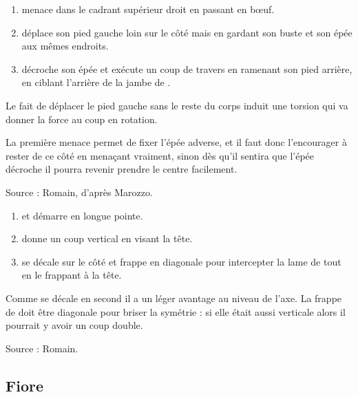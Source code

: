 \begin{technique}

\begin{enumerate}
	\item \A menace \D dans le cadrant supérieur droit en passant en bœuf.
	
	\item \A déplace son pied gauche loin sur le côté mais en gardant son buste et son épée aux mêmes endroits.
	
	\item \A décroche son épée et exécute un coup de travers en ramenant son pied arrière, en ciblant l'arrière de la jambe de \D.
\end{enumerate}

Le fait de déplacer le pied gauche sans le reste du corps induit une torsion qui va donner la force au coup en rotation.

La première menace permet de fixer l'épée adverse, et il faut donc l'encourager à rester de ce côté en menaçant vraiment, sinon dès qu'il sentira que l'épée décroche il pourra revenir prendre le centre facilement.

Source : Romain, d'après Marozzo.
\end{technique}


\begin{technique}

\begin{enumerate}
	\item \A et \D démarre en longue pointe.
	
	\item \A donne un coup vertical en visant la tête.
	
	\item \D se décale sur le côté et frappe en diagonale pour intercepter la lame de \A tout en le frappant à la tête.
\end{enumerate}

Comme \D se décale en second il a un léger avantage au niveau de l'axe.
La frappe de \D doit être diagonale pour briser la symétrie : si elle était aussi verticale alors il pourrait y avoir un coup double.

Source : Romain.
\end{technique}


\subsection{Fiore}


